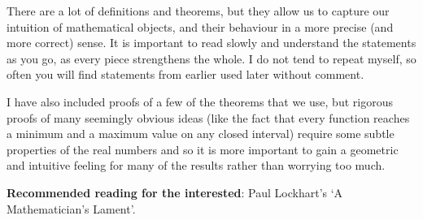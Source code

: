 There are a lot of definitions and theorems, but they allow us to capture our intuition of mathematical objects, and their behaviour in a more
precise (and more correct) sense. It is important to read slowly and understand the statements as you go, as every piece strengthens the whole.
I do not tend to repeat myself, so often you will find statements from earlier used later without comment.

I have also included proofs of a few of the theorems that we use, but rigorous proofs of many seemingly obvious ideas (like the fact that every function
reaches a minimum and a maximum value on any closed interval) require some subtle properties of the real numbers and so it is more important to gain a
geometric and intuitive feeling for many of the results rather than worrying too much.

\textbf{Recommended reading for the interested}: Paul Lockhart's `A Mathematician's Lament'.


